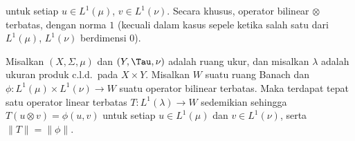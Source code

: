 

\noindent untuk setiap $u\in L^1(\mu)$, $v\in L^1(\nu)$. Secara khusus,
operator bilinear $\otimes$ terbatas, dengan norma $1$ (kecuali dalam kasus sepele
ketika salah satu dari $L^1(\mu)$, $L^1(\nu)$ berdimensi $0$).

Misalkan $(X,\Sigma,\mu)$ dan $(Y,\Tau,\nu)$ adalah ruang ukur, dan misalkan
$\lambda$ adalah ukuran produk c.l.d.\ pada $X\times Y$. Misalkan $W$ suatu
ruang Banach dan $\phi:L^1(\mu)\times L^1(\nu)\to W$ suatu operator bilinear
terbatas. Maka terdapat tepat satu operator linear terbatas
$T:L^1(\lambda)\to W$ sedemikian sehingga $T(u\otimes v)=\phi(u,v)$ untuk setiap
$u\in L^1(\mu)$ dan $v\in L^1(\nu)$, serta $\|T\|=\|\phi\|$.

